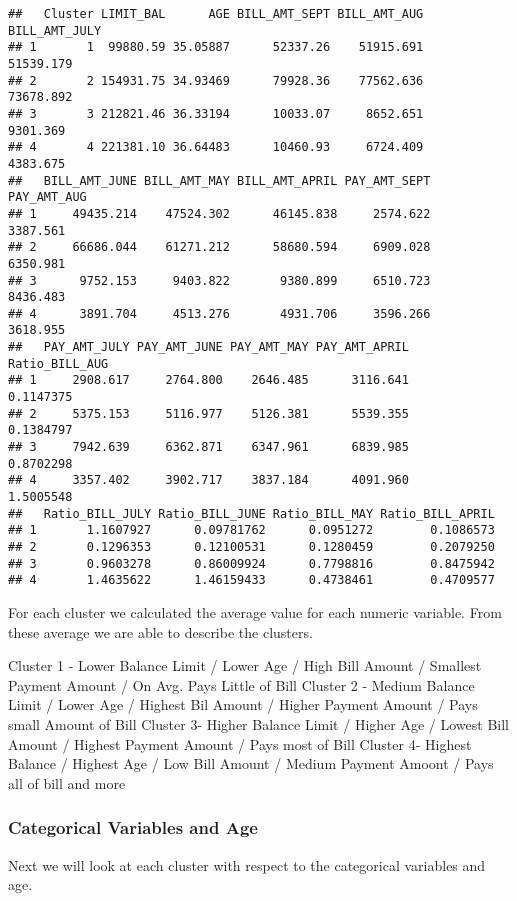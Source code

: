 \documentclass[]{article}
\begin{document}
\begin{verbatim}
##   Cluster LIMIT_BAL      AGE BILL_AMT_SEPT BILL_AMT_AUG BILL_AMT_JULY
## 1       1  99880.59 35.05887      52337.26    51915.691     51539.179
## 2       2 154931.75 34.93469      79928.36    77562.636     73678.892
## 3       3 212821.46 36.33194      10033.07     8652.651      9301.369
## 4       4 221381.10 36.64483      10460.93     6724.409      4383.675
##   BILL_AMT_JUNE BILL_AMT_MAY BILL_AMT_APRIL PAY_AMT_SEPT PAY_AMT_AUG
## 1     49435.214    47524.302      46145.838     2574.622    3387.561
## 2     66686.044    61271.212      58680.594     6909.028    6350.981
## 3      9752.153     9403.822       9380.899     6510.723    8436.483
## 4      3891.704     4513.276       4931.706     3596.266    3618.955
##   PAY_AMT_JULY PAY_AMT_JUNE PAY_AMT_MAY PAY_AMT_APRIL Ratio_BILL_AUG
## 1     2908.617     2764.800    2646.485      3116.641      0.1147375
## 2     5375.153     5116.977    5126.381      5539.355      0.1384797
## 3     7942.639     6362.871    6347.961      6839.985      0.8702298
## 4     3357.402     3902.717    3837.184      4091.960      1.5005548
##   Ratio_BILL_JULY Ratio_BILL_JUNE Ratio_BILL_MAY Ratio_BILL_APRIL
## 1       1.1607927      0.09781762      0.0951272        0.1086573
## 2       0.1296353      0.12100531      0.1280459        0.2079250
## 3       0.9603278      0.86009924      0.7798816        0.8475942
## 4       1.4635622      1.46159433      0.4738461        0.4709577
\end{verbatim}

For each cluster we calculated the average value for each numeric
variable. From these average we are able to describe the clusters.

Cluster 1 - Lower Balance Limit / Lower Age / High Bill Amount /
Smallest Payment Amount / On Avg. Pays Little of Bill Cluster 2 - Medium
Balance Limit / Lower Age / Highest Bil Amount / Higher Payment Amount /
Pays small Amount of Bill Cluster 3- Higher Balance Limit / Higher Age /
Lowest Bill Amount / Highest Payment Amount / Pays most of Bill Cluster
4- Highest Balance / Highest Age / Low Bill Amount / Medium Payment
Amoont / Pays all of bill and more

\subsubsection{Categorical Variables and
Age}\label{categorical-variables-and-age}

Next we will look at each cluster with respect to the categorical
variables and age.
\end{document}
